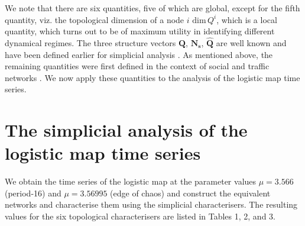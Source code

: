 \documentclass[aps,pre,superscriptaddress,groupedaddress,preprint]{revtex4}  %
\begin{document}
We note that there are six quantities, five of which are global, except for the fifth quantity, viz. the topological dimension of a node $i$  $\mathrm{dim}\, Q^{i}$, which is a local quantity, which turns out to be of maximum utility in identifying different dynamical regimes.  
The three structure vectors $\mathbf{Q}$, $\mathbf{N_s}$, $\mathbf{\widehat{Q}}$  
are well known and have been defined earlier for simplicial analysis \cite{jonsson}. As mentioned above, the remaining quantities were first defined in the context of social and traffic networks \cite{Maletic,Andjelkovich}.
We now apply these quantities to the analysis of the logistic map time series. 


% 
\section{The simplicial analysis of the logistic map time series}

\label{subsec:2}

We obtain the time series of the logistic map at the parameter values $\mu=3.566 $ (period-16) and $\mu= 3.56995$ (edge of chaos) and construct the equivalent networks
and characterise them using the simplicial characterisers. The resulting values for the six topological characterisers are listed in Tables 1, 2, and 3.
\end{document}
